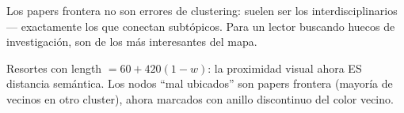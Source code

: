 \documentclass[11pt,a4paper]{article}
\begin{document}
\begin{ojo}
Los papers frontera no son errores de clustering: suelen ser los interdisciplinarios —
exactamente los que conectan subtópicos. Para un lector buscando huecos de
investigación, son de los más interesantes del mapa.
\end{ojo}

\begin{resumen}
Resortes con length $= 60 + 420(1-w)$: la proximidad visual ahora ES distancia
semántica. Los nodos ``mal ubicados'' son papers frontera (mayoría de vecinos en otro
cluster), ahora marcados con anillo discontinuo del color vecino.
\end{resumen}
\end{document}
